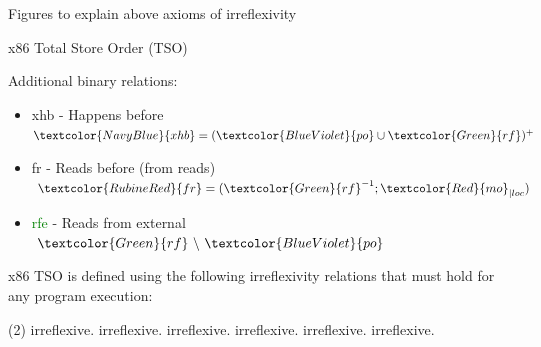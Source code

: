 \documentclass[xcolor={dvipsnames}, notes]{beamer}
\newcommand{\po}{\textcolor{BlueViolet}{po}}
\newcommand{\rf}{\textcolor{Green}{rf}}
\newcommand{\mo}{\textcolor{Red}{mo}}
\newcommand{\fr}{\textcolor{RubineRed}{fr}}
\newcommand{\xhb}{\textcolor{NavyBlue}{xhb}}
\newcommand{\rfe}{\textcolor{Green}{rfe}}
\begin{document}
    \begin{frame}{Figures to explain above axioms of irreflexivity}
        
        \begin{figure}
        \end{figure}

        \begin{figure}
        \end{figure}

    \end{frame}

    
    \begin{frame}{x86 Total Store Order (TSO)}
        
        Additional binary relations:
        \begin{itemize}
            \item {\xhb} - Happens before $ \xhb = (\po \cup \rf)^{+} $
            \item {\fr} - Reads before (from reads) $ \fr = (\rf^{-1};\mo_{|loc}) $ 
            \item {\rfe} - Reads from external $\rf \text{ \textbackslash} \ \po$
        \end{itemize}

        x86 TSO is defined using the following irreflexivity relations that must hold for any program execution:
        \begin{tasks}(2)
            \task {\xhb} irreflexive.
            \task {\mo;\xhb} irreflexive.
            \task {\fr;\xhb} irreflexive.
            \task {\fr;\mo} irreflexive.
            \task {\fr;\mo;\rfe;\po} irreflexive.
            \task {\fr;\mo;$[U \cup F]$;\po} irreflexive.
        \end{tasks}

    \end{frame}
    
\end{document}
